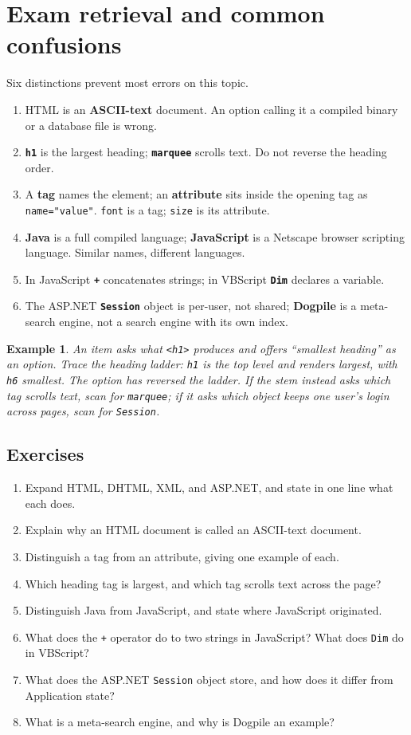\documentclass[11pt]{article}
\newtheorem{example}{Example}[section]
\begin{document}
\section{Exam retrieval and common confusions}
Six distinctions prevent most errors on this topic.
\begin{enumerate}
  \item HTML is an \textbf{ASCII-text} document. An option calling it a compiled binary or a database file is wrong.
  \item \textbf{\texttt{h1}} is the largest heading; \textbf{\texttt{marquee}} scrolls text. Do not reverse the heading order.
  \item A \textbf{tag} names the element; an \textbf{attribute} sits inside the opening tag as \texttt{name="value"}. \texttt{font} is a tag; \texttt{size} is its attribute.
  \item \textbf{Java} is a full compiled language; \textbf{JavaScript} is a Netscape browser scripting language. Similar names, different languages.
  \item In JavaScript \textbf{\texttt{+}} concatenates strings; in VBScript \textbf{\texttt{Dim}} declares a variable.
  \item The ASP.NET \textbf{\texttt{Session}} object is per-user, not shared; \textbf{Dogpile} is a meta-search engine, not a search engine with its own index.
\end{enumerate}

\begin{example}
An item asks what \texttt{<h1>} produces and offers ``smallest heading'' as an option. Trace the heading ladder: \texttt{h1} is the top level and renders largest, with \texttt{h6} smallest. The option has reversed the ladder. If the stem instead asks which tag scrolls text, scan for \texttt{marquee}; if it asks which object keeps one user's login across pages, scan for \texttt{Session}.
\end{example}

\subsection*{Exercises}
\begin{enumerate}[label=\arabic*.]
  \item Expand HTML, DHTML, XML, and ASP.NET, and state in one line what each does.
  \item Explain why an HTML document is called an ASCII-text document.
  \item Distinguish a tag from an attribute, giving one example of each.
  \item Which heading tag is largest, and which tag scrolls text across the page?
  \item Distinguish Java from JavaScript, and state where JavaScript originated.
  \item What does the \texttt{+} operator do to two strings in JavaScript? What does \texttt{Dim} do in VBScript?
  \item What does the ASP.NET \texttt{Session} object store, and how does it differ from Application state?
  \item What is a meta-search engine, and why is Dogpile an example?
\end{enumerate}
\end{document}
